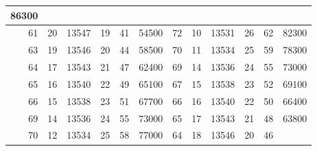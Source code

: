 \begin{table}[H]
{\begin{tabular}{|rrrrrr||rrrrrr|}
  \multicolumn{1}{r|}{86300} \\ \hline
\multicolumn{1}{|r|}{61} &
  \multicolumn{1}{r|}{20} &
  \multicolumn{1}{r|}{13547} &
  \multicolumn{1}{r|}{19} &
  \multicolumn{1}{r|}{41} &
  54500 &
  \multicolumn{1}{r|}{72} &
  \multicolumn{1}{r|}{10} &
  \multicolumn{1}{r|}{13531} &
  \multicolumn{1}{r|}{26} &
  \multicolumn{1}{r|}{62} &
  \multicolumn{1}{r|}{82300} \\ \hline
\multicolumn{1}{|r|}{63} &
  \multicolumn{1}{r|}{19} &
  \multicolumn{1}{r|}{13546} &
  \multicolumn{1}{r|}{20} &
  \multicolumn{1}{r|}{44} &
  58500 &
  \multicolumn{1}{r|}{70} &
  \multicolumn{1}{r|}{11} &
  \multicolumn{1}{r|}{13534} &
  \multicolumn{1}{r|}{25} &
  \multicolumn{1}{r|}{59} &
  \multicolumn{1}{r|}{78300} \\ \hline
\multicolumn{1}{|r|}{64} &
  \multicolumn{1}{r|}{17} &
  \multicolumn{1}{r|}{13543} &
  \multicolumn{1}{r|}{21} &
  \multicolumn{1}{r|}{47} &
  62400 &
  \multicolumn{1}{r|}{69} &
  \multicolumn{1}{r|}{14} &
  \multicolumn{1}{r|}{13536} &
  \multicolumn{1}{r|}{24} &
  \multicolumn{1}{r|}{55} &
  \multicolumn{1}{r|}{73000} \\ \hline
\multicolumn{1}{|r|}{65} &
  \multicolumn{1}{r|}{16} &
  \multicolumn{1}{r|}{13540} &
  \multicolumn{1}{r|}{22} &
  \multicolumn{1}{r|}{49} &
  65100 &
  \multicolumn{1}{r|}{67} &
  \multicolumn{1}{r|}{15} &
  \multicolumn{1}{r|}{13538} &
  \multicolumn{1}{r|}{23} &
  \multicolumn{1}{r|}{52} &
  \multicolumn{1}{r|}{69100} \\ \hline
\multicolumn{1}{|r|}{66} &
  \multicolumn{1}{r|}{15} &
  \multicolumn{1}{r|}{13538} &
  \multicolumn{1}{r|}{23} &
  \multicolumn{1}{r|}{51} &
  67700 &
  \multicolumn{1}{r|}{66} &
  \multicolumn{1}{r|}{16} &
  \multicolumn{1}{r|}{13540} &
  \multicolumn{1}{r|}{22} &
  \multicolumn{1}{r|}{50} &
  \multicolumn{1}{r|}{66400} \\ \hline
\multicolumn{1}{|r|}{69} &
  \multicolumn{1}{r|}{14} &
  \multicolumn{1}{r|}{13536} &
  \multicolumn{1}{r|}{24} &
  \multicolumn{1}{r|}{55} &
  73000 &
  \multicolumn{1}{r|}{65} &
  \multicolumn{1}{r|}{17} &
  \multicolumn{1}{r|}{13543} &
  \multicolumn{1}{r|}{21} &
  \multicolumn{1}{r|}{48} &
  \multicolumn{1}{r|}{63800} \\ \hline
\multicolumn{1}{|r|}{70} &
  \multicolumn{1}{r|}{12} &
  \multicolumn{1}{r|}{13534} &
  \multicolumn{1}{r|}{25} &
  \multicolumn{1}{r|}{58} &
  77000 &
  \multicolumn{1}{r|}{64} &
  \multicolumn{1}{r|}{18} &
  \multicolumn{1}{r|}{13546} &
  \multicolumn{1}{r|}{20} &
  \multicolumn{1}{r|}{46} &

\end{tabular}}
\end{table}
